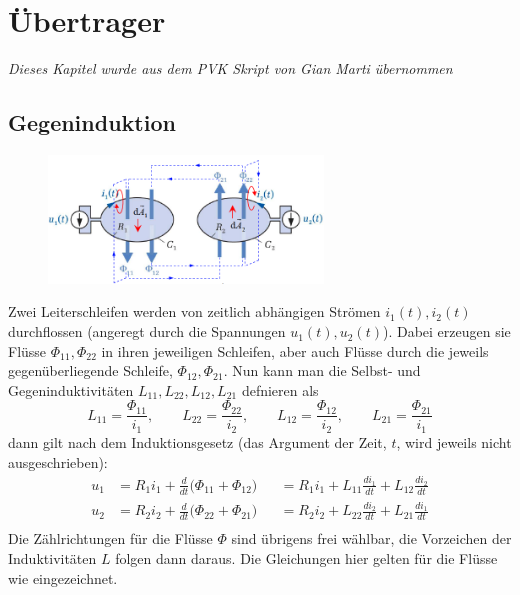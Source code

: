 
 \section{Übertrager}
 \textit{Dieses Kapitel wurde aus dem PVK Skript von Gian Marti übernommen  }

\subsection{Gegeninduktion}
\begin{figure}[H]
\center
\vspace{-0.5cm}
\includegraphics[width=0.65\textwidth]{img/Tra1}
\vspace{-0.2cm}
\end{figure}
Zwei Leiterschleifen werden von zeitlich abhängigen Strömen $i_1(t), i_2(t)$ durchflossen (angeregt durch die Spannungen $u_1(t),u_2(t)$). Dabei erzeugen sie Flüsse $\Phi_{11}, \Phi_{22}$ in ihren jeweiligen Schleifen, aber auch Flüsse durch die jeweils gegenüberliegende Schleife, $\Phi_{12},\Phi_{21}$.
Nun kann man die Selbst- und Gegeninduktivitäten $L_{11},L_{22},L_{12},L_{21}$ defnieren als
$$L_{11} = \frac{\Phi_{11}}{i_1}, \qquad L_{22} = \frac{\Phi_{22}}{i_2}, \qquad L_{12} = \frac{\Phi_{12}}{i_2}, \qquad L_{21} = \frac{\Phi_{21}}{i_1}$$
dann gilt nach dem Induktionsgesetz (das Argument der Zeit, $t$, wird jeweils nicht ausgeschrieben):
\begin{equation*}
\begin{alignedat}{2}
u_1 &= R_1i_1 + \frac{d}{dt}\big(\Phi_{11}+\Phi_{12}\big) &&= R_1i_1 + L_{11}\frac{di_1}{dt}+L_{12}\frac{di_2}{dt} \\
u_2 &= R_2i_2 + \frac{d}{dt}\big(\Phi_{22}+\Phi_{21}\big) &&= R_2i_2 + L_{22}\frac{di_2}{dt}+L_{21}\frac{di_1}{dt} \\
\end{alignedat}
\end{equation*}
Die Zählrichtungen für die Flüsse $\Phi$ sind übrigens frei wählbar, die Vorzeichen der Induktivitäten $L$ folgen dann daraus. Die Gleichungen hier gelten für die Flüsse wie eingezeichnet. \newline

